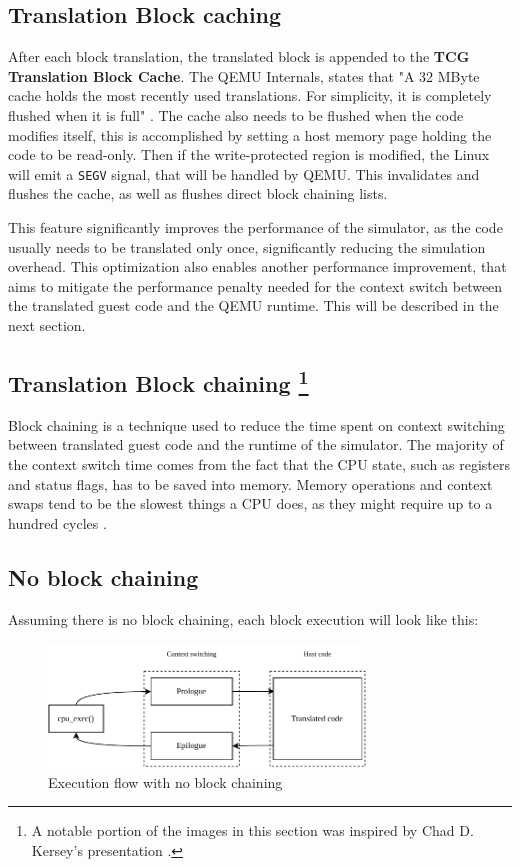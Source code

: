 \subsection{Translation Block caching}

After each block translation, the translated block is appended to the \textbf{TCG Translation Block Cache}.
The QEMU Internals, states that "A 32 MByte cache holds the most recently used translations. For simplicity, it is
completely flushed when it is full" \cite{QemuInternalsTech}. The cache also needs to be flushed when the code modifies
itself, this is accomplished by setting a host memory page holding the code to be read-only. Then if the
write-protected region is modified, the Linux will emit a \texttt{SEGV} signal, that will be handled by QEMU. This
invalidates and flushes the cache, as well as flushes direct block chaining lists.

This feature significantly improves the performance of the simulator, as the code usually needs to be translated only
once, significantly reducing the simulation overhead. This optimization also enables another performance improvement,
that aims to mitigate the performance penalty needed for the context switch between the translated guest code and the
QEMU runtime. This will be described in the next section.

\pagebreak
\subsection[Translation Block chaining]{Translation Block chaining
\footnote{A notable portion of the images in this section was inspired by Chad D. Kersey's presentation
\cite{QemuInternalsPresentation}.}}

Block chaining is a technique used to reduce the time spent on context switching between translated guest code and the
runtime of the simulator. The majority of the context switch time comes from the fact that the CPU state, such as
registers and status flags, has to be saved into memory. Memory operations and context swaps tend to be
the slowest things a CPU does, as they might require up to a hundred cycles \cite{FIND-A-CITATION}.

\subsection*{No block chaining}

Assuming there is no block chaining, each block execution will look like this:
\begin{figure}[h]
	\centering
	\includegraphics[width=0.75\textwidth]{figures/TbExecution-NoChain.pdf}
	\caption{Execution flow with no block chaining}
\end{figure}

